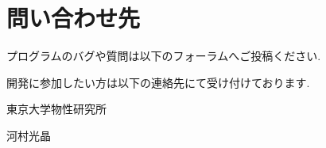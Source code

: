 \documentclass[letterpaper,10pt,dvipdfmx,openany]{sphinxmanual}
\begin{document}
\chapter{問い合わせ先}
\label{\detokenize{contact:id1}}\label{\detokenize{contact::doc}}
\sphinxAtStartPar
プログラムのバグや質問は以下のフォーラムへご投稿ください.

\sphinxAtStartPar
{}

\sphinxAtStartPar
開発に参加したい方は以下の連絡先にて受け付けております.

\sphinxAtStartPar
東京大学物性研究所

\sphinxAtStartPar
河村光晶

\sphinxAtStartPar
{}



\renewcommand{\indexname}{索引}
\printindex
\end{document}
